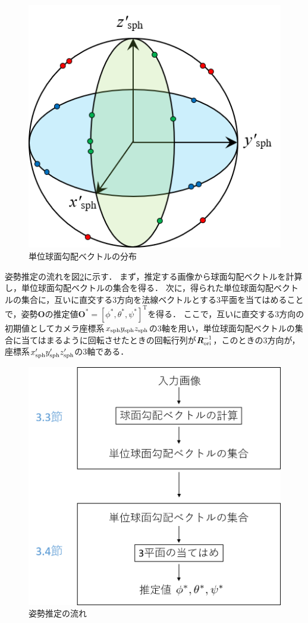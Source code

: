 \begin{figure}[tb]
 \begin{center}
 \includegraphics[width=0.45\columnwidth]{./chap3/fig/three_directions.png}
 \vspace{5mm}
 \caption{単位球面勾配ベクトルの分布}
 \label{fig:three_directions}
 \end{center}
\end{figure}

姿勢推定の流れを図\ref{fig:flow3}に示す．
まず，推定する画像から球面勾配ベクトルを計算し，単位球面勾配ベクトルの集合を得る．
次に，得られた単位球面勾配ベクトルの集合に，互いに直交する3方向を法線ベクトルとする3平面を当てはめることで，姿勢$\bm{O}$の推定値$\bm{O}^*=[\phi^*, \theta^*, \psi^*]^{\mathrm{T}}$を得る．
ここで，互いに直交する3方向の初期値としてカメラ座標系$x_{\rm{sph}}y_{\rm{sph}}z_{\rm{sph}}$の3軸を用い，単位球面勾配ベクトルの集合に当てはまるように回転させたときの回転行列が$\bm{R}^{-1}_{\rm{ori}}$，このときの3方向が，座標系$x'_{\rm{sph}}y'_{\rm{sph}}z'_{\rm{sph}}$の3軸である．


\begin{figure}[b]
 \begin{center}
 \includegraphics[width=0.6\columnwidth]{./chap3/fig/flow3.png}
 \vspace{5mm}
 \caption{姿勢推定の流れ}
 \label{fig:flow3}
 \end{center}
\end{figure}

